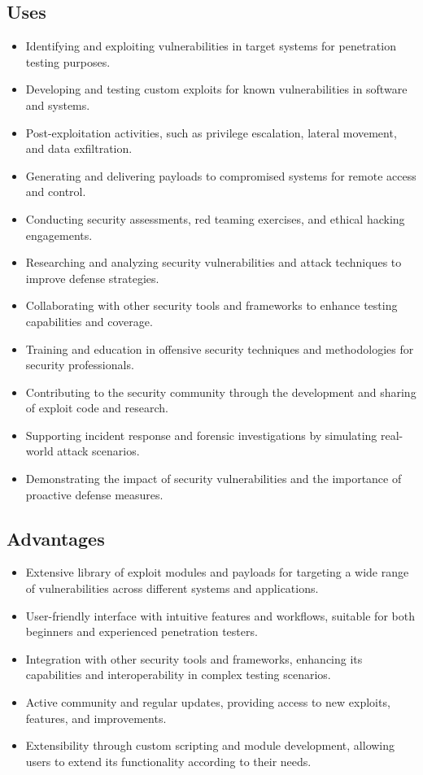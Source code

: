 \documentclass[11pt]{article}
\begin{document}
\subsection{Uses}

\begin{itemize}
    \item Identifying and exploiting vulnerabilities in target systems for penetration testing purposes.
    \item Developing and testing custom exploits for known vulnerabilities in software and systems.
    \item Post-exploitation activities, such as privilege escalation, lateral movement, and data exfiltration.
    \item Generating and delivering payloads to compromised systems for remote access and control.
    \item Conducting security assessments, red teaming exercises, and ethical hacking engagements.
    \item Researching and analyzing security vulnerabilities and attack techniques to improve defense strategies.
    \item Collaborating with other security tools and frameworks to enhance testing capabilities and coverage.
    \item Training and education in offensive security techniques and methodologies for security professionals.
    \item Contributing to the security community through the development and sharing of exploit code and research.
    \item Supporting incident response and forensic investigations by simulating real-world attack scenarios.
    \item Demonstrating the impact of security vulnerabilities and the importance of proactive defense measures.
\end{itemize}

\subsection{Advantages}
\begin{itemize}
    \item Extensive library of exploit modules and payloads for targeting a wide range of vulnerabilities across different systems and applications.
    \item User-friendly interface with intuitive features and workflows, suitable for both beginners and experienced penetration testers.
    \item Integration with other security tools and frameworks, enhancing its capabilities and interoperability in complex testing scenarios.
    \item Active community and regular updates, providing access to new exploits, features, and improvements.
    \item Extensibility through custom scripting and module development, allowing users to extend its functionality according to their needs.
\end{itemize}
\end{document}
